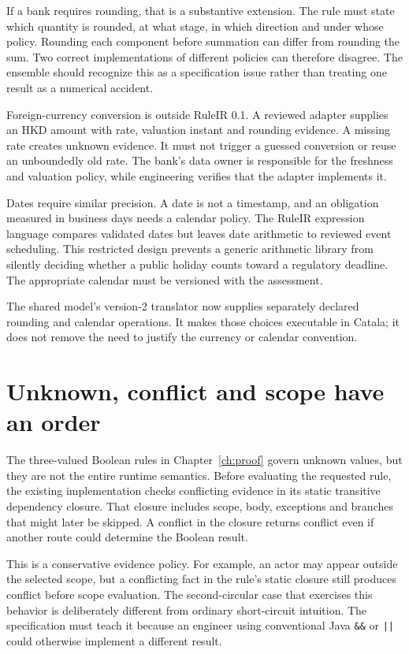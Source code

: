 \documentclass[12pt,a4paper,oneside,openany]{book}
\begin{document}
If a bank requires rounding, that is a substantive extension. The rule must state
which quantity is rounded, at what stage, in which direction and under whose
policy. Rounding each component before summation can differ from rounding the
sum. Two correct implementations of different policies can therefore disagree.
The ensemble should recognize this as a specification issue rather than treating
one result as a numerical accident.

Foreign-currency conversion is outside RuleIR 0.1. A reviewed adapter supplies an
HKD amount with rate, valuation instant and rounding evidence. A missing rate
creates unknown evidence. It must not trigger a guessed conversion or reuse an
unboundedly old rate. The bank's data owner is responsible for the freshness and
valuation policy, while engineering verifies that the adapter implements it.

Dates require similar precision. A date is not a timestamp, and an obligation
measured in business days needs a calendar policy. The RuleIR expression
language compares validated dates but leaves date arithmetic to reviewed event
scheduling. This restricted design prevents a generic arithmetic library from
silently deciding whether a public holiday counts toward a regulatory deadline.
The appropriate calendar must be versioned with the assessment.

The shared model's version-2 translator now supplies separately declared
rounding and calendar operations. It makes those choices executable in Catala;
it does not remove the need to justify the currency or calendar convention.

\section{Unknown, conflict and scope have an order}
\label{merge:M07:03}


The three-valued Boolean rules in Chapter~\ref{ch:proof} govern unknown values,
but they are not the entire runtime semantics. Before evaluating the requested
rule, the existing implementation checks conflicting evidence in its static
transitive dependency closure. That closure includes scope, body, exceptions and
branches that might later be skipped. A conflict in the closure returns conflict
even if another route could determine the Boolean result.

This is a conservative evidence policy. For example, an actor may appear outside
the selected scope, but a conflicting fact in the rule's static closure still
produces conflict before scope evaluation. The second-circular case that exercises
this behavior is deliberately different from ordinary short-circuit intuition.
The specification must teach it because an engineer using conventional Java
\texttt{\&\&} or \texttt{||} could otherwise implement a different result.
\end{document}
